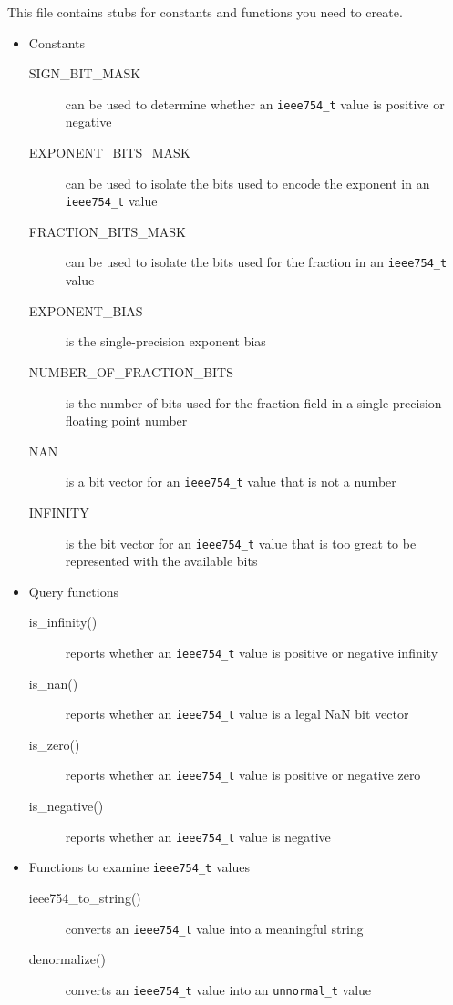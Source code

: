 This file contains stubs for constants and functions you need to create.
\begin{itemize}
    \item Constants
    \begin{description}
        \item[SIGN\_BIT\_MASK] can be used to determine whether an \lstinline{ieee754_t} value is positive or negative
        \item[EXPONENT\_BITS\_MASK] can be used to isolate the bits used to encode the exponent in an \lstinline{ieee754_t} value
        \item[FRACTION\_BITS\_MASK] can be used to isolate the bits used for the fraction in an \lstinline{ieee754_t} value
        \item[EXPONENT\_BIAS] is the single-precision exponent bias
        \item[NUMBER\_OF\_FRACTION\_BITS] is the number of bits used for the fraction field in a single-precision floating point number
        \item[NAN] is a bit vector for an \lstinline{ieee754_t} value that is not a number
        \item[INFINITY] is the bit vector for an \lstinline{ieee754_t} value that is too great to be represented with the available bits
    \end{description}
    \item Query functions
    \begin{description}
        \item[is\_infinity()] reports whether an \lstinline{ieee754_t} value is positive or negative infinity
        \item[is\_nan()] reports whether an \lstinline{ieee754_t} value is a legal NaN bit vector
        \item[is\_zero()] reports whether an \lstinline{ieee754_t} value is positive or negative zero
        \item[is\_negative()] reports whether an \lstinline{ieee754_t} value is negative
    \end{description}
    \item Functions to examine \lstinline{ieee754_t} values
    \begin{description}
        \item[ieee754\_to\_string()] converts an \lstinline{ieee754_t} value into a meaningful string
        \item[denormalize()] converts an \lstinline{ieee754_t} value into an \lstinline{unnormal_t} value

\end{description}
\end{itemize}
